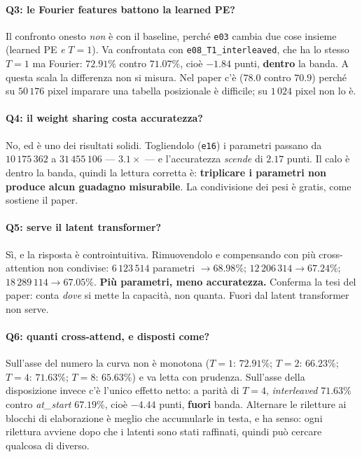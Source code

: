 \documentclass[
  11pt,
]{article}
\begin{document}
\paragraph{Q3: le Fourier features battono la learned PE?}
Il confronto onesto \emph{non} è con il baseline, perché \texttt{e03} cambia due cose insieme (learned PE \emph{e} $T{=}1$). Va confrontata con \texttt{e08\_T1\_interleaved}, che ha lo stesso $T{=}1$ ma Fourier: $72.91\%$ contro $71.07\%$, cioè $-1.84$ punti, \textbf{dentro} la banda. A questa scala la differenza non si misura. Nel paper c'è ($78.0$ contro $70.9$) perché su $50\,176$ pixel imparare una tabella posizionale è difficile; su $1\,024$ pixel non lo è.

\paragraph{Q4: il weight sharing costa accuratezza?}
No, ed è uno dei risultati solidi. Togliendolo (\texttt{e16}) i parametri passano da $10\,175\,362$ a $31\,455\,106$ --- $3.1\times$ --- e l'accuratezza \emph{scende} di $2.17$ punti. Il calo è dentro la banda, quindi la lettura corretta è: \textbf{triplicare i parametri non produce alcun guadagno misurabile}. La condivisione dei pesi è gratis, come sostiene il paper.

\paragraph{Q5: serve il latent transformer?}
Sì, e la risposta è controintuitiva. Rimuovendolo e compensando con più cross-attention non condivise: $6\,123\,514$ parametri $\to 68.98\%$; $12\,206\,314 \to 67.24\%$; $18\,289\,114 \to 67.05\%$. \textbf{Più parametri, meno accuratezza.} Conferma la tesi del paper: conta \emph{dove} si mette la capacità, non quanta. Fuori dal latent transformer non serve.

\paragraph{Q6: quanti cross-attend, e disposti come?}
Sull'asse del numero la curva non è monotona ($T{=}1$: $72.91\%$; $T{=}2$: $66.23\%$; $T{=}4$: $71.63\%$; $T{=}8$: $65.63\%$) e va letta con prudenza. Sull'asse della disposizione invece c'è l'unico effetto netto: a parità di $T{=}4$, \emph{interleaved} $71.63\%$ contro \emph{at\_start} $67.19\%$, cioè $-4.44$ punti, \textbf{fuori} banda. Alternare le riletture ai blocchi di elaborazione è meglio che accumularle in testa, e ha senso: ogni rilettura avviene dopo che i latenti sono stati raffinati, quindi può cercare qualcosa di diverso.
\end{document}
